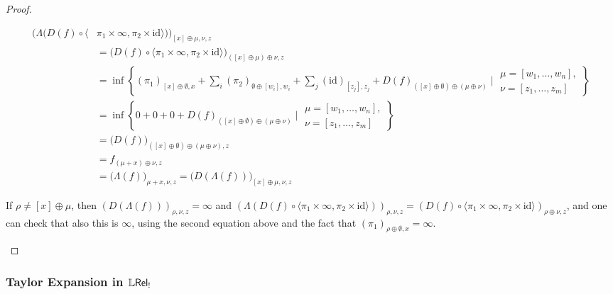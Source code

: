 \begin{proof}
\begin{description}
{\small
\begin{align*}
\big(\Lambda(D(f)\circ \langle&  \pi_{1}\times \infty, \pi_{2}\times \mathrm{id}\rangle)\big)_{[x]\oplus\mu,\nu,z}\\
&=
\big(D(f)\circ \langle \pi_{1}\times \infty, \pi_{2}\times \mathrm{id}\rangle\big)_{([x]\oplus\mu)\oplus\nu, z}\\
&=
\inf\left\{
( \pi_{1})_{[x]\oplus \emptyset,x}+
\sum_{i}(\pi_{2})_{\emptyset\oplus [w_{i}],w_{i}}
+
\sum_{j}(\mathrm{id})_{[z_{j}],z_{j}}
 + D(f)_{([x]\oplus \emptyset)\oplus(\mu\oplus \nu)}
\mid
\begin{matrix}
\mu=[w_{1},\dots, w_{n}],\\
\nu=[z_{1},\dots, z_{m}]
\end{matrix}
\right\}\\
&=
\inf\left\{
0+0
+
0 + D(f)_{([x]\oplus \emptyset)\oplus(\mu\oplus \nu)}
\mid
\begin{matrix}
\mu=[w_{1},\dots, w_{n}],\\
\nu=[z_{1},\dots, z_{m}]
\end{matrix}
\right\}\\
&=
\big(D(f)\big)_{ ([x]\oplus\emptyset)\oplus(\mu\oplus\nu),z}\\
&=
f_{(\mu+x)\oplus\nu, z}\\
& =
\big(\Lambda(f)\big)_{\mu+x,\nu,z}=\big(D(\Lambda(f))\big)_{[x]\oplus\mu, \nu,z}
\end{align*}
}

If $\rho\neq [x]\oplus\mu$, then $(D(\Lambda(f)))_{\rho,\nu,z}=\infty$ and $
(\Lambda(D(f)\circ \langle  \pi_{1}\times \infty, \pi_{2}\times \mathrm{id}\rangle))_{\rho,\nu,z}=
(D(f)\circ \langle \pi_{1}\times \infty, \pi_{2}\times \mathrm{id}\rangle)_{\rho\oplus\nu, z}
$, and one can check that also this is $\infty$, using the second equation above and the fact that $(\pi_{1})_{\rho\oplus\emptyset,x}=\infty$.\end{description}


\end{proof}



\subsubsection{Taylor Expansion in $\mathbb{L} \mathsf{Rel}_!$}


